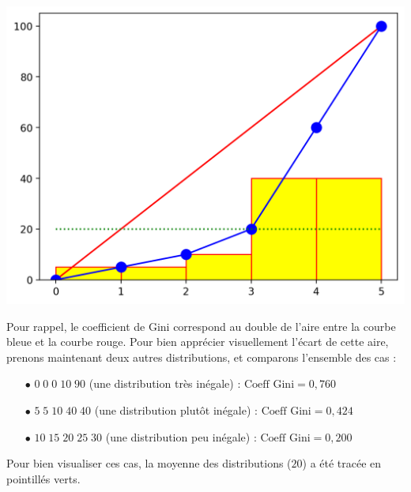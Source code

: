 \documentclass[11pt,a4paper]{article}
\begin{document}
\begin{center}
\includegraphics[scale=0.60]{img/exemple_courbe_lorenz-5-5-10-40-40.png}
\end{center}

\bigskip

Pour rappel, le coefficient de Gini correspond au double de l'aire entre la courbe bleue et la courbe rouge.
Pour bien apprécier visuellement l'écart de cette aire, prenons maintenant deux autres distributions, et comparons l'ensemble des cas :

\begin{itemize}
\item[$\bullet$] $ 0 \; 0 \; 0 \; 10 \; 90 $ (une distribution très inégale) : $ \text{Coeff Gini} = 0,760 $
\item[$\bullet$] $ 5 \; 5 \; 10 \; 40 \; 40 $ (une distribution plutôt inégale) : $ \text{Coeff Gini} = 0,424 $
\item[$\bullet$] $ 10 \; 15 \; 20 \; 25 \; 30 $ (une distribution peu inégale) : $ \text{Coeff Gini} = 0,200 $
\end{itemize}

Pour bien visualiser ces cas, la moyenne des distributions ($ 20 $) a été tracée en pointillés verts.
\end{document}
